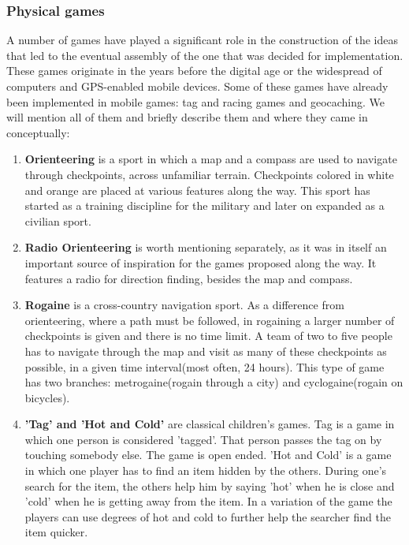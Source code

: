 \documentclass{article}
\begin{document}
\subsubsection{Physical games}

A number of games have played a significant role in the construction of the
ideas that led to the eventual assembly of the one that was decided for
implementation. These games originate in the years before the digital age or the
widespread of computers and GPS-enabled mobile devices. Some of these games have
already been implemented in mobile games: tag and racing games and geocaching.
We will mention all of them and briefly describe them and where they came in
conceptually:
\begin{enumerate}
  \item \textbf{Orienteering} is a sport in which a map and a compass are used
  to navigate through checkpoints, across unfamiliar terrain. Checkpoints
  colored in white and orange are placed at various features along the way. This
  sport has started as a training discipline for the military and later on
  expanded as a civilian sport.
  
  \item \textbf{Radio Orienteering} is worth mentioning separately, as it was in
  itself an important source of inspiration for the games proposed along the
  way. It features a radio for direction finding, besides the map and compass. 
  
  \item \textbf{Rogaine} is a cross-country navigation sport. As a difference
  from orienteering, where a path must be followed, in rogaining a larger number
  of checkpoints is given and there is no time limit. A team of two to five
  people has to navigate through the map and visit as many of these checkpoints
  as possible, in a given time interval(most often, 24 hours). This type of game
  has two branches: metrogaine(rogain through a city) and cyclogaine(rogain on
  bicycles).
  
  \item \textbf{'Tag' and 'Hot and Cold'} are classical children's games. Tag is
  a game in which one person is considered 'tagged'. That person passes the tag
  on by touching somebody else. The game is open ended. 'Hot and Cold' is a game
  in which one player has to find an item hidden by the others. During one's
  search for the item, the others help him by saying 'hot' when he is close and
  'cold' when he is getting away from the item. In a variation of the game the
  players can use degrees of hot and cold to further help the searcher find the
  item quicker.
    
\end{enumerate}
\end{document}
